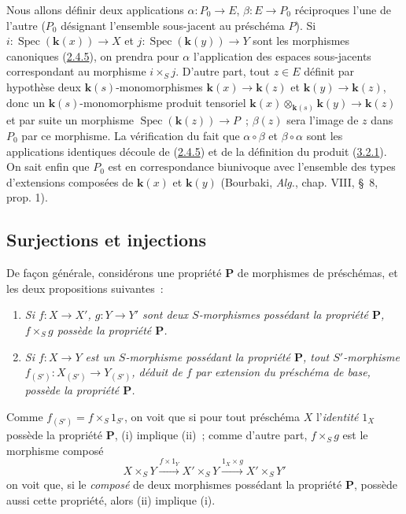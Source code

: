 Nous allons définir deux applications $\alpha:P_0\to E$, $\beta:E\to P_0$
réciproques l'une de l'autre ($P_0$ désignant l'ensemble sous-jacent au
préschéma $P$). Si $i:\operatorname{Spec}(\boldsymbol{k}(x))\to X$ et
$j:\operatorname{Spec}(\boldsymbol{k}(y))\to Y$ sont les morphismes canoniques
(\hyperref[I.2.4.5-fr]{2.4.5}), on prendra pour $\alpha$ l'application des
espaces sous-jacents correspondant au morphisme $i\times_S j$. D'autre part,
tout $z\in E$ définit par hypothèse deux $\boldsymbol{k}(s)$-monomorphismes
$\boldsymbol{k}(x)\to \boldsymbol{k}(z)$ et $\boldsymbol{k}(y)\to \boldsymbol{k}(z)$, donc un $\boldsymbol{k}(s)$-monomorphisme produit
tensoriel $\boldsymbol{k}(x)\otimes_{\boldsymbol{k}(s)}\boldsymbol{k}(y)\to \boldsymbol{k}(z)$ et par suite un morphisme
$\operatorname{Spec}(\boldsymbol{k}(z))\to P$~; $\beta(z)$ sera l'image de $z$ dans $P_0$
par ce morphisme. La vérification du fait que $\alpha\circ\beta$ et
$\beta\circ\alpha$ sont les applications identiques découle de
(\hyperref[I.2.4.5-fr]{2.4.5}) et de la définition du produit
(\hyperref[I.3.2.1-fr]{3.2.1}). On sait enfin que $P_0$ est en correspondance
biunivoque avec l'ensemble des types d'extensions composées de $\boldsymbol{k}(x)$ et
$\boldsymbol{k}(y)$ (Bourbaki, \emph{Alg.}, chap. VIII, \S~8, prop. 1).

\subsection{Surjections et injections}
\label{subsection:I.3.5-fr}

\begin{env}[3.5.1]
\label{I.3.5.1-fr}
De façon générale, considérons une propriété $\boldsymbol{P}$ de morphismes de
préschémas, et les deux propositions suivantes~:
\begin{enumerate}
  \item[(i)] \itshape Si $f:X\to X'$, $g:Y\to Y'$ sont deux $S$-morphismes possédant
  la propriété $\boldsymbol{P}$, $f\times_S g$ possède la propriété $\boldsymbol{P}$.
  \upshape\item[(ii)] \itshape Si $f:X\to Y$ est un $S$-morphisme possédant la propriété
  $\boldsymbol{P}$, tout $S'$-morphisme $f_{(S')}:X_{(S')}\to Y_{(S')}$, déduit
  de $f$ par extension du préschéma de base, possède la propriété
  $\boldsymbol{P}$.
\end{enumerate}

Comme $f_{(S')}=f\times_S 1_{S'}$, on voit que si pour tout préschéma $X$
l'\emph{identité} $1_X$ possède la propriété $\boldsymbol{P}$, (i) implique
(ii)~; comme d'autre part, $f\times_S g$ est le morphisme composé
\label{I.3.5.1.product-composition-fr}
\[
  X\times_S Y\xrightarrow{f\times 1_Y}X'\times_S Y
  \xrightarrow{1_X\times g}X'\times_S Y'
\]
on voit que, si le \emph{composé} de deux morphismes possédant la propriété
$\boldsymbol{P}$, possède aussi cette propriété, alors (ii) implique (i).
\end{env}

